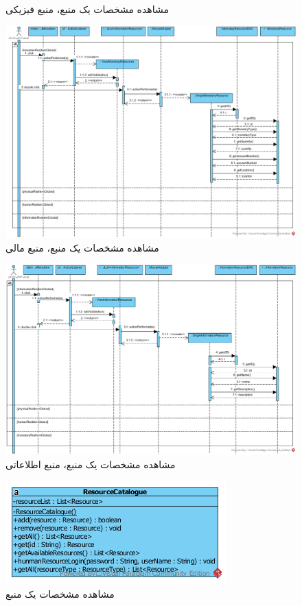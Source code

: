 \begin{landscape}
\begin{landscape}
\begin{figure}[H]
	\caption{مشاهده مشخصات یک منبع، منبع فیزیکی}
\end{figure}
\begin{figure}[H]
	\centering
	\includegraphics[scale=0.8]{img/sequence-design/ViewResourceAttributes_MONETARY}
	\caption{مشاهده مشخصات یک منبع، منبع مالی}
\end{figure}
\begin{figure}[H]
	\centering
	\includegraphics[scale=0.8]{img/sequence-design/ViewResourceAttributes_INFORMATION}
	\caption{مشاهده مشخصات یک منبع، منبع اطلاعاتی}
\end{figure}

\begin{figure}[H]
	\centering
	\includegraphics[scale=0.7]{img/sequence-design/ViewResourceAttributesC}
	\caption{مشاهده مشخصات یک منبع}
\end{figure}
\end{landscape}


\end{landscape}
